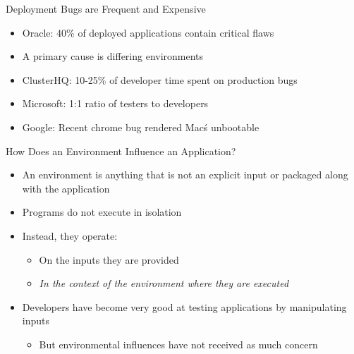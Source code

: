 \documentclass[pdf]{beamer}
\begin{document}


\begin{frame}{Deployment Bugs are Frequent and Expensive}
  \begin{itemize}
    \item{Oracle: 40\% of deployed applications contain critical flaws}
    \item{A primary cause is differing environments}
    \item{ClusterHQ: 10-25\% of developer time spent on production bugs}
    \item{Microsoft: 1:1 ratio of testers to developers}
    \item{Google: Recent chrome bug rendered Mac\'s unbootable}
  \end{itemize}
\end{frame}




\begin{frame}{How Does an Environment Influence an Application?}
  \begin{itemize}
    \item{An environment is anything that is not an explicit input or
      packaged along with the application}
    \item{Programs do not execute in isolation}
    \item{Instead, they operate:}
      \begin{itemize}
        \item{On the inputs they are provided}
        \item{\textit{In the context of the environment where they are executed}}
      \end{itemize}
    \item{Developers have become very good at testing applications by
      manipulating inputs}
      \begin{itemize}
        \item{But environmental influences have not received as much
            concern}
      \end{itemize}
  \end{itemize}
\end{frame}
\end{document}

